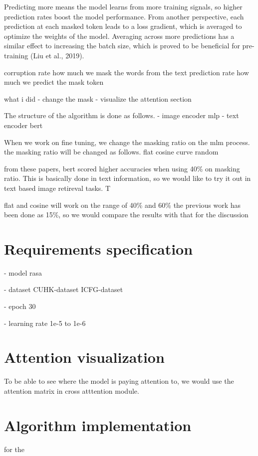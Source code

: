 Predicting more means the model learns from more training signals, so higher prediction rates boost the model performance. From another perspective, each prediction at each masked token leads to a loss gradient, which is averaged to optimize the weights of the model. Averaging across more predictions has a similar effect to increasing the batch size, which is proved to be beneficial for pre-training (Liu et al., 2019). 


corruption rate how much we mask the words from the text
prediction rate how much we predict the mask token 


what i did 
- change the mask 
- visualize the attention section

The structure of the algorithm is done as follows. 
- image encoder
  mlp 
- text encoder
  bert 

When we work on fine tuning, we change the masking ratio on the mlm process. 
the masking ratio will be changed as follows.
flat 
cosine curve 
random 

from these papers, bert scored higher accuracies when using 40\% on masking ratio. This is basically done in text information, 
so we would like to try it out in text based image retireval tasks. T

flat and cosine will work on the range of 40\% and 60\% 
the previous work has been done as 15\%, so we would compare the results with that for the discussion 

\section{Requirements specification}

- model
rasa

- dataset 
CUHK-dataset
ICFG-dataset

- epoch
30

- learning rate 
1e-5 to 1e-6

\section{Attention visualization}
To be able to see where the model is paying attention to, we would use the attention matrix in cross atttention module.



\section{Algorithm implementation}

for the 